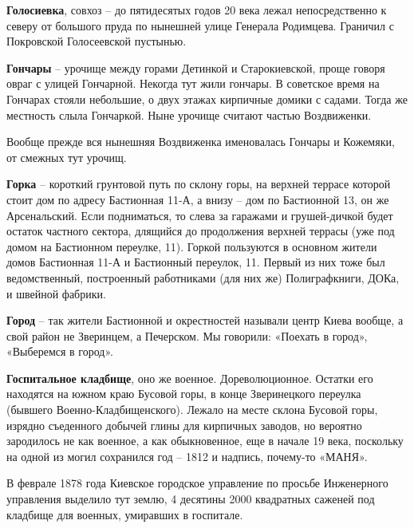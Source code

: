 \medskip

\textbf{Голосиевка}, совхоз – до пятидесятых годов 20 века лежал непосредственно к северу от большого пруда по нынешней улице Генерала Родимцева. Граничил с Покровской Голосеевской пустынью.\\

\medskip

\textbf{Гончары} – урочище между горами Детинкой и Старокиевской, проще говоря овраг с улицей Гончарной. Некогда тут жили гончары. В советское время на Гончарах стояли небольшие, о двух этажах кирпичные домики с садами. Тогда же местность слыла Гончаркой. Ныне урочище считают частью Воздвиженки.

Вообще прежде вся нынешняя Воздвиженка именовалась Гончары и Кожемяки, от смежных тут урочищ.\\

\medskip

\textbf{Горка} – короткий грунтовой путь по склону горы, на верхней террасе которой стоит дом по адресу Бастионная 11-А, а внизу – дом по Бастионной 13, он же Арсенальский. Если подниматься, то слева за гаражами и грушей-дичкой будет остаток частного сектора, длящийся до продолжения верхней террасы (уже под домом на Бастионном переулке, 11). Горкой пользуются в основном жители домов Бастионная 11-А и Бастионный переулок, 11. Первый из них тоже был ведомственный, построенный работниками (для них же) Полиграфкниги, ДОКа, и швейной фабрики.\\

\medskip


\textbf{Город} – так жители Бастионной и окрестностей называли центр Киева вообще, а свой район не Зверинцем, а Печерском. Мы говорили: «Поехать в город», «Выберемся в город».\\

\medskip

\textbf{Госпитальное кладбище}, оно же военное. Дореволюционное. Остатки его находятся на южном краю Бусовой горы, в конце Зверинецкого переулка (бывшего Военно-Кладбищенско\-го). Лежало на месте склона Бусовой горы, изрядно съеденного добычей глины для кирпичных заводов, но вероятно зародилось не как военное, а как обыкновенное, еще в начале 19 века, поскольку на одной из могил сохранился год – 1812 и надпись, почему-то «МАНЯ».

В феврале 1878 года Киевское городское управление по просьбе Инженерного управления выделило тут землю, 4 десятины 2000 квадратных саженей под кладбище для военных, умиравших в госпитале. 

